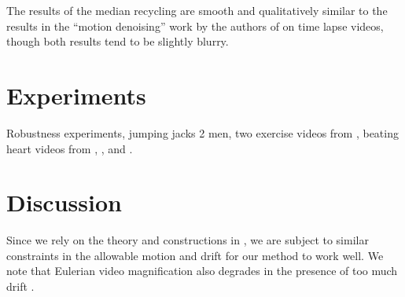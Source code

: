 \documentclass{article}
\begin{document}
The results of the median recycling are smooth and qualitatively similar to the results in the ``motion denoising'' work by the authors of \cite{rubinstein2011motion} on time lapse videos, though both results tend to be slightly blurry.


\section{Experiments}

Robustness experiments, jumping jacks 2 men, two exercise videos from \cite{levy2015live}, beating heart videos from \cite{traliehigh}, \cite{wu2012eulerian}, and \cite{wadhwa2013phase}.


\section{Discussion}

Since we rely on the theory and constructions in \cite{tralie2017quasi}, we are subject to similar constraints in the allowable motion and drift for our method to work well.  We note that Eulerian video magnification also degrades in the presence of too much drift \cite{wu2012eulerian, wadhwa2013phase}.




\end{document}
